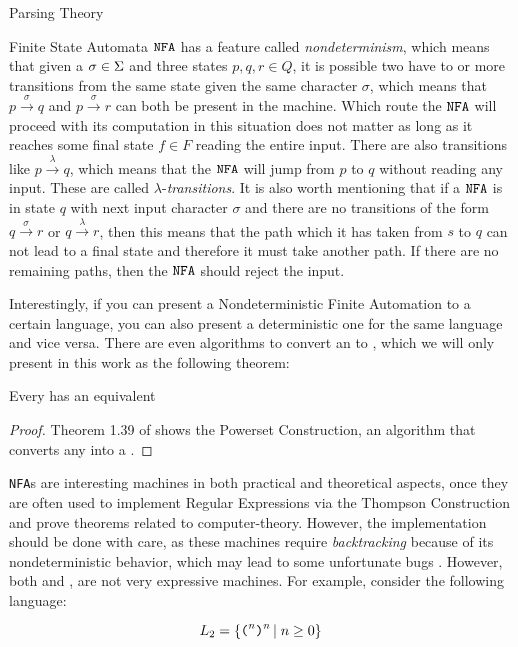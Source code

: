 \begin{section}{Parsing Theory}
\begin{subsection}{Finite State Automata}
$\texttt{NFA}$ has a feature called \textit{nondeterminism}, which means that given a
$\sigma \in \Sigma$ and three states $p, q, r \in Q$, it is possible two have to
or more transitions from the same state given the same character $\sigma$,
which means that $p \overset{\sigma}{\longrightarrow} q$ and $p
\overset{\sigma}{\longrightarrow} r$ can both be present in the machine. Which
route the $\texttt{NFA}$ will proceed with its computation in this situation does not
matter as long as it reaches some final state $f \in F$ reading the entire
input. There are also transitions like $p \overset{\lambda}{\longrightarrow}
q$, which means that the $\texttt{NFA}$ will jump from $p$ to $q$ without reading any
input. These are called $\lambda$-\textit{transitions}. It is also worth
mentioning that if a $\texttt{NFA}$ is in state $q$ with next input character $\sigma$
and there are no transitions of the form $q \overset{\sigma}{\longrightarrow}
r$ or $q \overset{\lambda}{\longrightarrow} r$, then this means that the path
which it has taken from $s$ to $q$ can not lead to a final state and therefore
it must take another path. If there are no remaining paths, then the $\texttt{NFA}$
should reject the input.

Interestingly, if you can present a Nondeterministic Finite Automation to a
certain language, you can also present a deterministic one for the same
language and vice versa. There are even algorithms to convert an  to
, which we will only present in this work as the following
theorem:

\begin{theorem}\label{nfa_to_dfa}
Every  has an equivalent 
\end{theorem}
\begin{proof}
	Theorem 1.39 of \citep{sipser2012} shows the Powerset Construction, an algorithm
	that converts any  into a .
\end{proof}

\texttt{NFA}s are interesting machines in both practical and theoretical aspects,
once they are often used to implement Regular Expressions via the Thompson
Construction \citep{dragonbook} and prove theorems related to computer-theory.
However, the implementation should be done with care, as these machines require
\textit{backtracking} because of its nondeterministic behavior, which may lead
to some unfortunate bugs \citep{PR86164}. However, both \DFA and \NFA, are not
very expressive machines. For example, consider the following language:

$$L_2 = \{\texttt{(}^n \texttt{)}^n\,|\;n \geq 0\}$$


\end{subsection}
\end{section}
